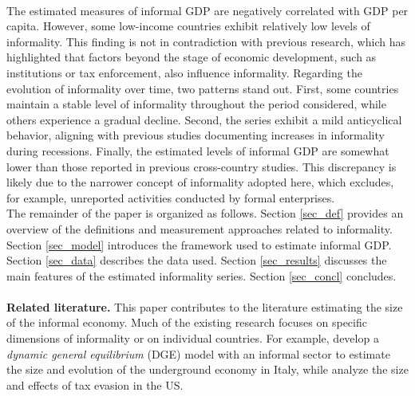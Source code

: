 \documentclass[letterpaper, 12pt]{article}
\begin{document}
\\The estimated measures of informal GDP are negatively correlated with GDP per capita. However, some low-income countries exhibit relatively low levels of informality. This finding is not in contradiction with previous research, which has highlighted that factors beyond the stage of economic development, such as institutions or tax enforcement, also influence informality. Regarding the evolution of informality over time, two patterns stand out. First, some countries maintain a stable level of informality throughout the period considered, while others experience a gradual decline. Second, the series exhibit a mild anticyclical behavior, aligning with previous studies documenting increases in informality during recessions. Finally, the estimated levels of informal GDP are somewhat lower than those reported in previous cross-country studies. This discrepancy is likely due to the narrower concept of informality adopted here, which excludes, for example, unreported activities conducted by formal enterprises.
\\The remainder of the paper is organized as follows. Section \ref{sec_def} provides an overview of the definitions and measurement approaches related to informality. 
Section \ref{sec_model} introduces the framework used to estimate informal GDP. Section \ref{sec_data} describes the data used. Section \ref{sec_results} discusses the main features of the estimated informality series. Section \ref{sec_concl} concludes.
\\
\\
\noindent
\textbf{Related literature.} This paper contributes to the literature estimating the size of the informal economy. Much of the existing research focuses on specific dimensions of informality or on individual countries. For example, \textcolor{blue}{\textcite{orsietal2014}} develop a \textit{dynamic general equilibrium} (DGE) model with an informal sector to estimate the size and evolution of the underground economy in Italy, while \textcolor{blue}{\textcite{dinolaetal2021}} analyze the size and effects of tax evasion in the US.
\end{document}

